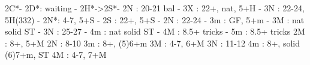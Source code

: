 2C*- 
2D*: waiting
   - 2H*->2S*- 2N : 20-21 bal
             - 3X : 22+, nat, 5+H
             - 3N : 22-24, 5H(332)
        - 2N*: 4-7, 5+S
   - 2S : 22+, 5+S
   - 2N : 22-24
   - 3m : GF, 5+m
   - 3M : nat solid ST
   - 3N : 25-27
   - 4m : nat solid ST
   - 4M : 8.5+ tricks
   - 5m : 8.5+ tricks
2M : 8+, 5+M
2N : 8-10
3m : 8+, (5)6+m 
3M : 4-7, 6+M
3N : 11-12
4m : 8+, solid (6)7+m, ST
4M : 4-7, 7+M